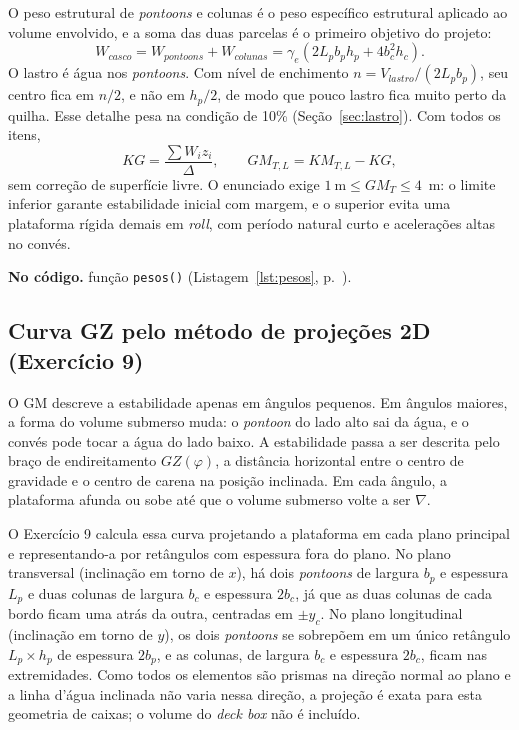 \documentclass[11pt,a4paper]{article}
\newcommand{\notacodigo}[1]{\begin{nocodigo}\textbf{\sffamily\color{azul}No código.} #1\end{nocodigo}}
\newcommand{\lst}[1]{Listagem~\ref{lst:#1}, p.~\pageref{lst:#1}}
\newcommand{\Wc}{W_{casco}}
\begin{document}
O peso estrutural de \emph{pontoons} e colunas é o peso específico estrutural aplicado ao volume
envolvido, e a soma das duas parcelas é o primeiro objetivo do projeto:
\begin{equation}
\Wc = W_{pontoons} + W_{colunas} = \gamma_e\left(2 L_p b_p h_p + 4 b_c^2 h_c\right).
\end{equation}
O lastro é água nos \emph{pontoons}. Com nível de enchimento $n = V_{lastro}/(2 L_p b_p)$, seu
centro fica em $n/2$, e não em $h_p/2$, de modo que pouco lastro fica muito perto da quilha. Esse
detalhe pesa na condição de 10\% (Seção~\ref{sec:lastro}). Com todos os itens,
\begin{equation}
KG = \frac{\sum W_i z_i}{\Delta}, \qquad GM_{T,L} = KM_{T,L} - KG ,
\end{equation}
sem correção de superfície livre. O enunciado exige $1~\text{m} \le GM_T \le 4$~m: o limite
inferior garante estabilidade inicial com margem, e o superior evita uma plataforma rígida demais
em \emph{roll}, com período natural curto e acelerações altas no convés.

\notacodigo{função \texttt{pesos()} (\lst{pesos}).}

\subsection{Curva GZ pelo método de projeções 2D (Exercício 9)}\label{sec:gz-teoria}

O GM descreve a estabilidade apenas em ângulos pequenos. Em ângulos maiores, a forma do volume
submerso muda: o \emph{pontoon} do lado alto sai da água, e o convés pode tocar a água do lado
baixo. A estabilidade passa a ser descrita pelo braço de endireitamento $GZ(\varphi)$, a distância
horizontal entre o centro de gravidade e o centro de carena na posição inclinada. Em cada ângulo,
a plataforma afunda ou sobe até que o volume submerso volte a ser $\nabla$.

O Exercício 9 calcula essa curva projetando a plataforma em cada plano principal e representando-a
por retângulos com espessura fora do plano. No plano transversal (inclinação em torno de $x$), há
dois \emph{pontoons} de largura $b_p$ e espessura $L_p$ e duas colunas de largura $b_c$ e espessura
$2b_c$, já que as duas colunas de cada bordo ficam uma atrás da outra, centradas em $\pm y_c$. No
plano longitudinal (inclinação em torno de $y$), os dois \emph{pontoons} se sobrepõem em um único
retângulo $L_p \times h_p$ de espessura $2b_p$, e as colunas, de largura $b_c$ e espessura $2b_c$,
ficam nas extremidades. Como todos os elementos são prismas na direção normal ao plano e a linha
d'água inclinada não varia nessa direção, a projeção é exata para esta geometria de caixas; o
volume do \emph{deck box} não é incluído.
\end{document}
